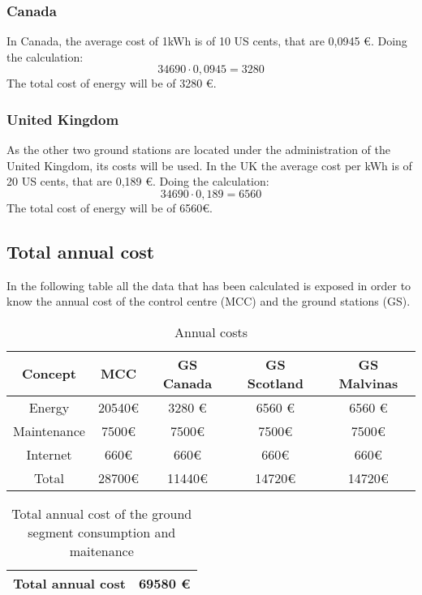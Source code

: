 \documentclass[12pt,a4paper]{report}
\begin{document}
\subsubsection{Canada}
In Canada, the average cost of 1kWh is of 10 US cents, that are 0,0945 \euro. Doing the calculation:
\begin{equation}
34690\cdot 0,0945= 3280
\end{equation}
The total cost of energy will be of 3280 \euro.
\subsubsection{United Kingdom}
As the other two ground stations are located under the administration of the United Kingdom, its costs will be used. In the UK the average cost per kWh is of 20 US cents, that are 0,189 \euro. Doing the calculation: 
  \begin{equation}
34690\cdot 0,189= 6560
\end{equation}
The total cost of energy will be of 6560\euro. 
\subsection{Total annual cost}
In the following table all the data that has been calculated is exposed in order to know the annual cost of the control centre (MCC) and the ground stations (GS).
\begin{table}[H]
\begin{center}
\begin{tabular}{|c|c|c|c|c|}
\hline
\textbf{Concept}&\textbf{MCC}&\textbf{GS Canada}&\textbf{GS Scotland}&\textbf{GS Malvinas}\\
\hline
Energy&20540\euro &3280 \euro &6560 \euro &6560 \euro\\
\hline
Maintenance&7500\euro &7500\euro &7500\euro &7500\euro \\
\hline
Internet&660\euro &660\euro &660\euro &660\euro\\
\hline
Total&28700\euro &11440\euro &14720\euro &14720\euro \\
\hline
\end{tabular}
\caption{Annual costs}
\end{center}
\end{table}
\begin{table}[H]
\begin{center}
\begin{tabular}{|c|c|}
\hline
\textbf{Total annual cost}&\textbf{69580 \euro}\\
\hline
\end{tabular}
\caption{Total annual cost of the ground segment consumption and maitenance}
\end{center}
\end{table}


\end{document}
